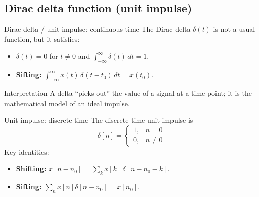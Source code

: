 \documentclass[aspectratio=169]{beamer}
\begin{document}
\subsection{Dirac delta function (unit impulse)}

\begin{frame}{Dirac delta / unit impulse: continuous-time}
\small
The Dirac delta $\delta(t)$ is not a usual function, but it satisfies:
\begin{itemize}
  \item $\delta(t)=0$ for $t\neq 0$ and $\int_{-\infty}^{\infty}\delta(t)\,dt = 1$.
  \item \textbf{Sifting:} $\int_{-\infty}^{\infty} x(t)\,\delta(t-t_0)\,dt = x(t_0)$.
\end{itemize}
\begin{block}{Interpretation}
A delta ``picks out'' the value of a signal at a time point; it is the mathematical model of an ideal impulse.
\end{block}

\centering
{}

\end{frame}

\begin{frame}{Unit impulse: discrete-time}
\small
The discrete-time unit impulse is
\[
\delta[n] = \begin{cases}
1, & n=0\\
0, & n\neq 0
\end{cases}
\]
Key identities:
\begin{itemize}
  \item \textbf{Shifting:} $x[n-n_0] = \sum_k x[k]\,\delta[n-n_0-k]$.
  \item \textbf{Sifting:} $\sum_n x[n] \delta[n-n_0] = x[n_0]$.
\end{itemize}

\centering
{}

\end{frame}
\end{document}
